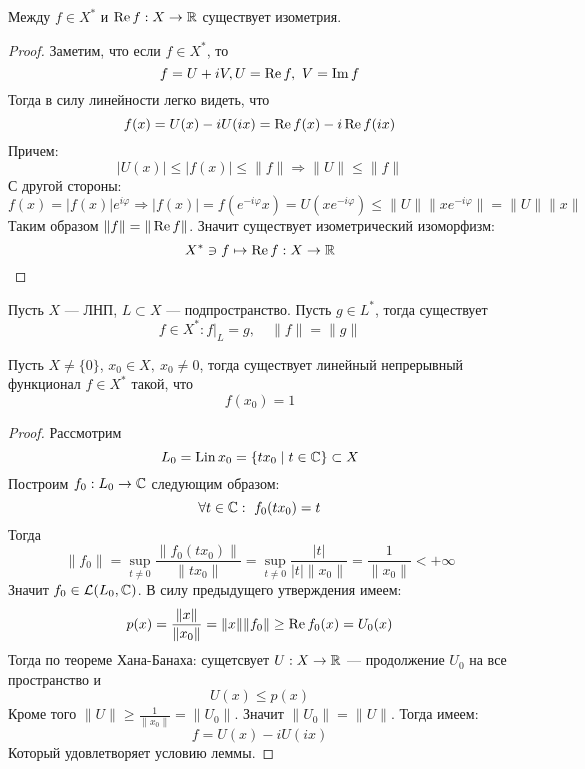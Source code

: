 \begin{claim}
	Между $f \in X^*$ и $\operatorname{Re} f: X \rightarrow \mathbb{R}$ существует изометрия.
\end{claim}
\begin{proof}
	Заметим, что если $f \in X^*$, то 
	$$
	f = U + iV, U = \operatorname{Re} f, \ V = \operatorname{Im} f
	$$
	Тогда в силу линейности легко видеть, что 
	$$
	f(x) = U(x) - iU(ix) = \operatorname{Re} f(x) - i \operatorname{Re} f(ix)
	$$
	Причем: 
	$$
	|U(x)| \leq |f(x)| \leq \|f\| \Rightarrow \|U\| \leq \|f\|
	$$
	С другой стороны:
	$$
	f(x) = |f(x)|e^{i \varphi} \Rightarrow |f(x)| = f(e^{-i \varphi} x ) = U(x e^{-i\varphi}) \leq \|U\| \|x e^{-i\varphi}\| = \|U\|\|x\| 
	$$
	Таким образом $\|f\| = \|\operatorname{Re} f\|$. Значит существует изометрический изоморфизм:
	$$
	X^* \ni f \mapsto \operatorname{Re} f: X \rightarrow \mathbb{R} 
	$$
\end{proof}
\begin{next0}
	Пусть $X$ --- ЛНП, $L \subset X$ --- подпространство. Пусть $g \in L^*$, тогда существует 
	$$
	f \in X^*\colon f\big|_L = g, \quad \|f\| = \|g\|
	$$
\end{next0}

\begin{lemma}\label{lem:f}
	Пусть $X \neq\{0\}$, $x_0 \in X, \ x_0 \neq 0$, тогда существует линейный непрерывный функционал $f \in X^*$ такой, что 
	$$
	f(x_0) = 1 
	$$
\end{lemma}
\begin{proof}
	Рассмотрим 
	$$
	L_0 = \operatorname{Lin}{x_0} = \{t x_0 \mid t \in \mathbb{C} \} \subset X
	$$
	Построим  $f_0: L_0 \to \mathbb{C}$ следующим образом:
	$$
	\forall t \in \mathbb{C}: \ f_0(tx_0) = t 
	$$
	Тогда 
	$$
	\|f_0\| = \sup\limits_{ t \neq 0}\frac{\|f_0(t x_0)\|}{\|tx_0\|} = \sup\limits_{ t \neq 0}\frac{|t|}{|t| \|x_0\|} = \frac{1}{\|x_0\|} < + \infty
	$$
	Значит $f_0 \in \mathcal{L}(L_0, \mathbb{C})$. В силу предыдущего утверждения имеем:
	$$
	p(x) = \frac{\|x\|}{\|x_0\|} = \|x\| \|f_0\| \geq \operatorname{Re} f_0 (x) = U_0(x)
	$$
	Тогда по теореме Хана-Банаха: сущетсвует $U: X \rightarrow \mathbb{R}$ --- продолжение $U_0$ на все пространство и 
	$$
	U(x) \leq p(x)
	$$
	Кроме того $\|U\| \geq \frac{1}{\|x_0\|} = \|U_0\|$. Значит $\|U_0\| =  \|U\|$. Тогда имеем:
	$$
	f = U(x) - iU(ix)
	$$
	Который удовлетворяет условию леммы.
\end{proof}
